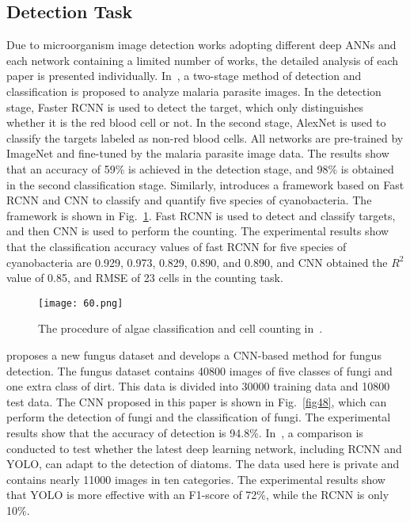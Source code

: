 \subsection{Detection Task}
Due to microorganism image detection works adopting different deep ANNs and each network containing a limited number of works, the detailed analysis of each paper is presented individually. In~\cite{Hung-2017-AFRO}, a two-stage method of detection and classification is proposed to analyze malaria parasite images. In the detection stage, Faster RCNN is used to detect the target, which only distinguishes whether it is the red blood cell or not. In the second stage, AlexNet is used to classify the targets labeled as non-red blood cells. All networks are pre-trained by ImageNet and fine-tuned by the malaria parasite image data. The results show that an accuracy of 59\% is achieved in the detection stage, and 98\% is obtained in the second classification stage. Similarly, \cite{Baek-2020-IECS} introduces a framework based on Fast RCNN and CNN to classify and quantify five species of cyanobacteria. The framework is shown in Fig.~\ref{fig60}. Fast RCNN is used to detect and classify targets, and then CNN is used to perform the counting. The experimental results show that the classification accuracy values of fast RCNN for five species of cyanobacteria are 0.929, 0.973, 0.829, 0.890, and 0.890, and CNN obtained the $R^{2}$ value of 0.85, and RMSE of 23 cells in the counting task.


\begin{figure}[htbp!]
\centering
\texttt{[image: 60.png]}
\caption{The procedure of algae classification and cell counting in~\cite{Baek-2020-IECS}.}
\label{fig60}
\end{figure}

\cite{Tahir-2018-AFSD} proposes a new fungus dataset and develops a CNN-based method for fungus detection. The fungus dataset contains 40800 images of five classes of fungi and one extra class of dirt. This data is divided into 30000 training data and 10800 test data. The CNN proposed in this paper is shown in Fig.~\ref{fig48}, which can perform the detection of fungi and the classification of fungi. The experimental results show that the accuracy of detection is 94.8\%. In~\cite{Pedraza-2018-LPCN}, a comparison is conducted to test whether the latest deep learning network, including RCNN and YOLO, can adapt to the detection of diatoms. The data used here is private and contains nearly 11000 images in ten categories. The experimental results show that YOLO is more effective with an F1-score of 72\%, while the RCNN is only 10\%.

